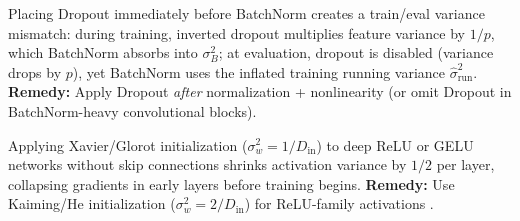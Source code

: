 \documentclass[../../../../master.tex]{subfiles}
\begin{document}
\begin{pitfall}
Placing Dropout immediately before BatchNorm creates a train/eval variance mismatch: during training, inverted dropout multiplies feature variance by $1/p$, which BatchNorm absorbs into $\sigma_B^2$; at evaluation, dropout is disabled (variance drops by $p$), yet BatchNorm uses the inflated training running variance $\hat{\sigma}_{\text{run}}^2$. \textbf{Remedy:} Apply Dropout \emph{after} normalization + nonlinearity (or omit Dropout in BatchNorm-heavy convolutional blocks).
\end{pitfall}

\begin{pitfall}
Applying Xavier/Glorot initialization ($\sigma_w^2 = 1/D_{\text{in}}$) to deep ReLU or GELU networks without skip connections shrinks activation variance by $1/2$ per layer, collapsing gradients in early layers before training begins. \textbf{Remedy:} Use Kaiming/He initialization ($\sigma_w^2 = 2/D_{\text{in}}$) for ReLU-family activations .
\end{pitfall}
\end{document}
